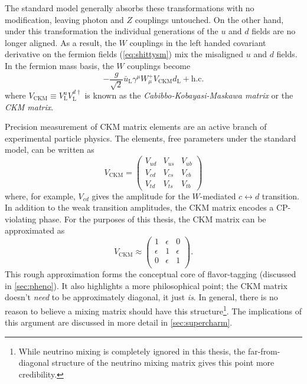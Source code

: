 The standard model generally absorbs these transformations with no modification, leaving photon and $Z$ couplings untouched.
On the other hand, under this transformation the individual generations of the $u$ and $d$ fields are no longer aligned. As a result, the $W$ couplings in the left handed covariant derivative on the fermion fields (\cref{eq:shittysm}) mix the misaligned $u$ and $d$ fields.
In the fermion mass basis, the $W$ couplings become
\begin{equation}
  - \frac{g}{\sqrt{2}} \bar{u}_{\mathrm{L}} \gamma^\mu W^+_\mu V_{\text{CKM}} d_{\mathrm{L}} + \text{h.c.}
\end{equation}
where $V_{\text{CKM}} \equiv V^u_{\mathrm{L}}V^{d\dag}_{\mathrm{L}}$ is known as the \emph{Cabibbo-Kobayasi-Maskawa matrix} or the \emph{CKM matrix}.

Precision measurement of CKM matrix elements are an active branch of experimental particle physics. The elements, free parameters under the standard model, can be written as
\newcommand{\ckmrow}[1]{V_{#1 d} & V_{#1 s} & V_{#1 b}}
\begin{equation}
V_{\text{CKM}} = \begin{pmatrix}
  \ckmrow{u} \\ \ckmrow{c} \\ \ckmrow{t}
\end{pmatrix}
\end{equation}
where, for example, $V_{cd}$ gives the amplitude for the $W$-mediated $c \leftrightarrow d$ transition. In addition to the weak transition amplitudes, the CKM matrix encodes a CP-violating phase. For the purposes of this thesis, the CKM matrix can be approximated as
\begin{equation}
V_{\text{CKM}} \approx
\begin{pmatrix}
  1 & \epsilon & 0 \\
  \epsilon & 1 & \epsilon \\
  0 & \epsilon & 1 \\
\end{pmatrix}.
\end{equation}
This rough approximation forms the conceptual core of flavor-tagging (discussed in \cref{sec:pheno}). It also highlights a more philosophical point; the CKM matrix doesn't \emph{need} to be approximately diagonal, it just \emph{is}. In general, there is no reason to believe a mixing matrix should have this structure\footnote{While neutrino mixing is completely ignored in this thesis, the far-from-diagonal structure of the neutrino mixing matrix gives this point more credibility.}. The implications of this argument are discussed in more detail in \cref{sec:supercharm}.


